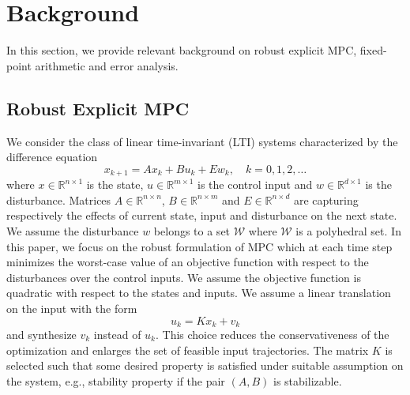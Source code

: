 \section{Background}
In this section, we provide relevant background on robust explicit MPC,
fixed-point arithmetic and error analysis.

\subsection{Robust Explicit MPC}
\def\reals{\mathbb{R}}
We consider the class of linear time-invariant (LTI) systems characterized by the difference equation
\begin{equation}
\label{eq:DSS}
x_{k+1}=Ax_k+Bu_k+Ew_k,\quad  k=0,1,2,\ldots
\end{equation}
where $x\in \reals^{n\times 1}$ is the state, $u\in \reals^{m\times 1}$ is the control input and $w\in \reals^{d\times 1}$ is the disturbance. Matrices $A\in \reals^{n\times n}$, $B\in \reals^{n\times m}$ and $E\in \reals^{n\times d}$ are capturing respectively the effects of current state, input and disturbance on the next state. We assume the disturbance $w$ belongs to a set $\mathcal{W}$ where $\mathcal{W}$ is a polyhedral set.
In this paper, we focus on the robust formulation of MPC which at each time step
minimizes the worst-case value of an objective function with respect to the
disturbances over the control inputs. We assume the objective function is
quadratic with respect to the states and inputs.
We assume a linear translation on the input with the form
$$u_k=Kx_k+v_k$$
and synthesize $v_k$ instead of $u_k$. This choice reduces the 
conservativeness of the optimization and enlarges the set of feasible input
trajectories. The matrix $K$ is selected such that some desired property is satisfied under suitable assumption on the system, e.g., stability property if the pair $(A,B)$ is stabilizable.

